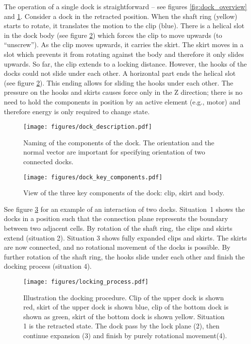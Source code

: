 The operation of a single dock is straightforward -- see figures
\ref{fig:dock_overview} and \ref{fig:dock_description}. Consider a dock in the
retracted position. When the shaft ring (yellow) starts to rotate, it translates
the motion to the clip (blue). There is a helical slot in the dock body (see
figure \ref{fig:dock_key_components}) which forces the clip to move upwards (to
``unscrew''). As the clip moves upwards, it carries the skirt. The skirt moves
in a slot which prevents it from rotating against the body and therefore it only
slides upwards. So far, the clip extends to a locking distance. However, the
hooks of the docks could not slide under each other. A horizontal part ends the
helical slot (see figure \ref{fig:dock_key_components}). This ending allows for
sliding the hooks under each other. The pressure on the hooks and skirts causes
force only in the Z direction; there is no need to hold the components in
position by an active element (e.g., motor) and therefore energy is only
required to change state.

\begin{figure}[t]
    \centering
    \texttt{[image: figures/dock\_description.pdf]}
    \caption{Naming of the components of the dock. The orientation and the
    normal vector are important for specifying orientation of two connected
    docks. }
    \label{fig:dock_description}
\end{figure}

\begin{figure}[t]
    \centering
    \texttt{[image: figures/dock\_key\_components.pdf]}
    \caption{View of the three key components of the dock: clip, skirt and body.}
    \label{fig:dock_key_components}
\end{figure}

See figure \ref{fig:dock_locking_process} for an example of an interaction of
two docks. Situation~1 shows the docks in a position such that the connection
plane represents the boundary between two adjacent cells. By rotation of the
shaft ring, the clips and skirts extend (situation 2). Situation 3 shows fully
expanded clips and skirts. The skirts are now connected, and no rotational
movement of the docks is possible. By further rotation of the shaft ring, the
hooks slide under each other and finish the docking process (situation 4).

\begin{figure}[!ht]
    \centering
    \texttt{[image: figures/locking\_process.pdf]}
    \caption{Illustration the docking procedure. Clip of the upper dock is
    shown red, skirt of the upper dock is shown blue, clip of the bottom dock is
    shown as green, skirt of the bottom dock is shown yellow.  Situation 1 is
    the retracted state. The dock pass by the lock plane (2), then continue
    expansion (3) and finish by purely rotational movement(4). }
    \label{fig:dock_locking_process}
\end{figure}

